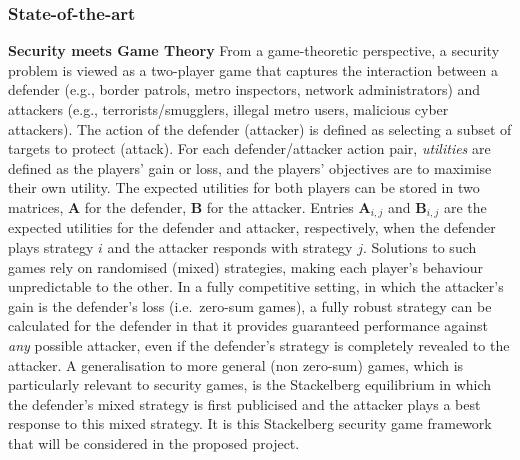  

 

\subsubsection*{State-of-the-art}
\textbf{Security meets Game Theory }
From a game-theoretic perspective, a security problem is viewed as a two-player game that captures the interaction between a defender (e.g., border patrols, metro inspectors, network administrators) and attackers (e.g., terrorists/smugglers, illegal metro users, malicious cyber attackers). The action of the defender (attacker) is defined as selecting a subset of targets to protect (attack). For each defender/attacker action pair, \textit{utilities} are defined as the players' gain or loss, and the players' objectives are to maximise their own utility. %
 The expected utilities for both players can be stored in two  matrices,  $\boldsymbol A$ for the defender,  $\boldsymbol B$ for the attacker. Entries $\boldsymbol A_{i,j}$ and  $\boldsymbol  B_{i,j}$  are the expected utilities for the defender and attacker, respectively, when the defender plays strategy $i$ and the attacker responds with strategy $j$.
Solutions to such games rely on randomised (mixed) strategies, making each player's behaviour unpredictable to the other.  In a fully competitive setting, in which the attacker's gain is the defender's loss (i.e.\ zero-sum games), a fully robust strategy can be calculated for the defender in that it provides guaranteed performance against {\em any} possible attacker, even if the defender's strategy is completely revealed to the attacker.  
A generalisation to more general (non zero-sum) games, which is particularly relevant to security games, is the Stackelberg equilibrium\cite{korzhyk2011stackelberg} in which the defender's mixed strategy is first publicised and the attacker plays a best response to this mixed strategy.
It is this Stackelberg security game framework that will be considered in the proposed project.

